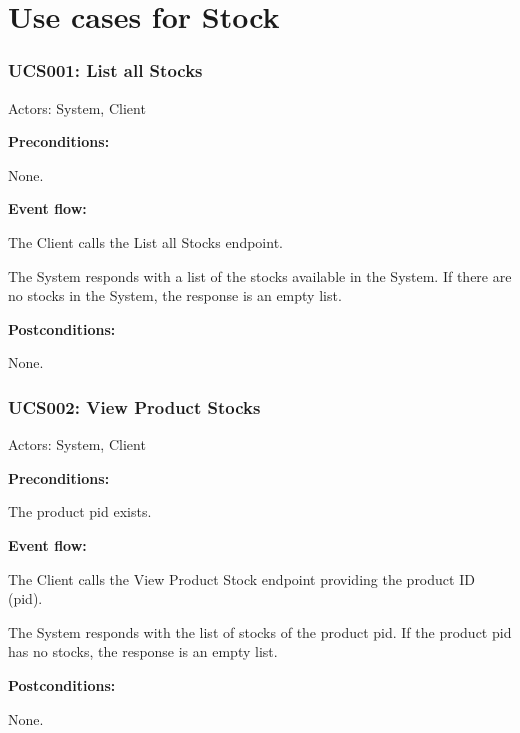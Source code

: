 \section{Use cases for Stock}

\begin{ucbox}{\subsubsection{UCS001: List all Stocks}}
\label{UCS001}

Actors: System, Client

\textbf{Preconditions:}

\ucitem None.

\textbf{Event flow:}

\ucitem The Client calls the List all Stocks endpoint.

\ucitem The System responds with a list of the stocks available in the System. If there are no stocks in the System, the response is an empty list.

\textbf{Postconditions:}

\ucitem None.

\end{ucbox}

\begin{ucbox}{\subsubsection{UCS002: View Product Stocks}}
\label{UCS002}

Actors: System, Client

\textbf{Preconditions:}

\ucitem The product pid exists.

\textbf{Event flow:}

\ucitem The Client calls the View Product Stock endpoint providing the product ID (pid).

\ucitem The System responds with the list of stocks of the product pid. If the product pid has no stocks, the response is an empty list.

\textbf{Postconditions:}

\ucitem None.

\end{ucbox}


